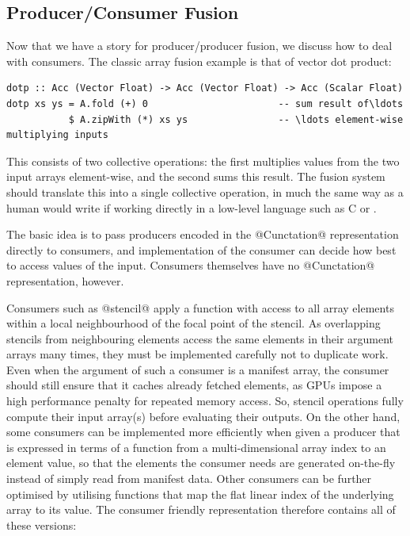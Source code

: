 \subsection{Producer/Consumer Fusion}
\label{sec:producer_consumer_fusion}

Now that we have a story for producer/producer fusion, we discuss how to deal
with consumers. The classic array fusion example is that of vector dot product:

\begin{lstlisting}[style=haskell]
dotp :: Acc (Vector Float) -> Acc (Vector Float) -> Acc (Scalar Float)
dotp xs ys = A.fold (+) 0                       -- sum result of\ldots
           $ A.zipWith (*) xs ys                -- \ldots element-wise multiplying inputs
\end{lstlisting}
%
This consists of two collective operations: the first multiplies values from the
two input arrays element-wise, and the second sums this result. The fusion
system should translate this into a single collective operation, in much the
same way as a human would write if working directly in a low-level language such
as C or \CUDA.

The basic idea is to pass producers encoded in the @Cunctation@
representation directly to consumers, and implementation of the consumer can
decide how best to access values of the input. Consumers themselves have no
@Cunctation@ representation, however.

Consumers such as @stencil@ apply a function with access to all array
elements within a local neighbourhood of the focal point of the stencil. As
overlapping stencils from neighbouring elements access the same elements in
their argument arrays many times, they must be implemented carefully not to
duplicate work. Even when the argument of such a consumer is a manifest array,
the consumer should still ensure that it caches already fetched elements, as
GPUs impose a high performance penalty for repeated memory access. So, stencil
operations fully compute their input array(s) before evaluating their outputs.
On the other hand, some consumers can be implemented more efficiently when given
a producer that is expressed in terms of a function from a multi-dimensional
array index to an element value, so that the elements the consumer needs are
generated on-the-fly instead of simply read from manifest data. Other consumers
can be further optimised by utilising functions that map the flat linear index
of the underlying array to its value. The consumer friendly representation
therefore contains all of these versions:

